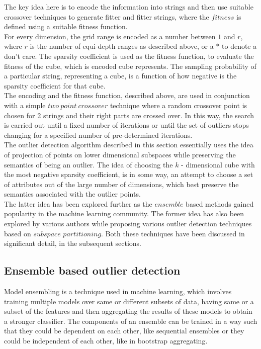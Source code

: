 The key idea here is to encode the information into strings and then use suitable crossover techniques to generate fitter and fitter strings, where the $fitness$ is defined using a suitable fitness function. \\

For every dimension, the grid range is encoded as a number between $1$ and $r$, where $r$ is the number of equi-depth ranges as described above, or a $*$ to denote a don't care. The sparsity coefficient is used as the fitness function, to evaluate the fitness of the cube, which is encoded cube represents. The sampling probability of a particular string, representing a cube, is a function of how negative is the sparsity coefficient for that cube. \\

The encoding and the fitness function, described above, are used in conjunction with a simple $two\ point\ crossover$ technique where a random crossover point is chosen for 2 strings and their right parts are crossed over. In this way, the search is carried out until a fixed number of iterations or until the set of outliers stops changing for a specified number of pre-determined iterations. \\

The outlier detection algorithm described in this section essentially uses the idea of projection of points on lower dimensional subspaces while preserving the semantics of being an outlier. The idea of choosing the $k$ - dimensional cube with the most negative sparsity coefficient, is in some way, an attempt to choose a set of attributes out of the large number of dimensions, which best preserve the semantics associated with the outlier points. \\

The latter idea has been explored further as the $ensemble$ based methods gained popularity in the machine learning community. The former idea has also been explored by various authors while proposing various outlier detection techniques based on $subspace$ $partitioning$. Both these techniques have been discussed in significant detail, in the subsequent sections.

\subsection{Ensemble based outlier detection}

Model ensembling is a technique used in machine learning, which involves training multiple models over same or different subsets of data, having same or a subset of the features and then aggregating the results of these models to obtain a stronger classifier. The components of an ensemble can be trained in a way such that they could be dependent on each other, like sequential ensembles\cite{RayanaZA16} or they could be independent of each other, like in bootstrap aggregating. \\

